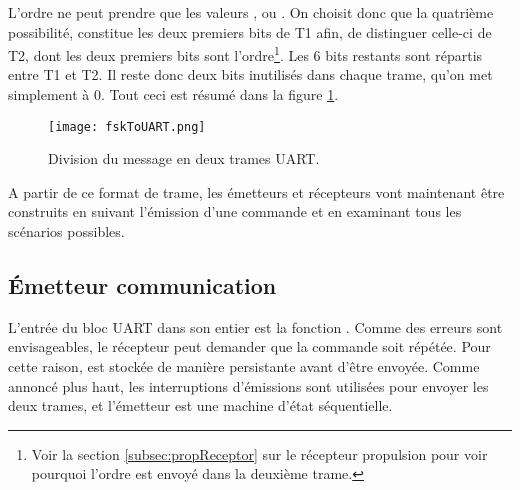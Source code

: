 L'ordre ne peut prendre que les valeurs ,  ou . On choisit donc que la quatrième possibilité,  constitue les deux premiers bits de T1 afin, de distinguer celle-ci de T2, dont les deux premiers bits sont l'ordre\footnote{Voir la section \ref{subsec:propReceptor} sur le récepteur propulsion pour voir pourquoi l'ordre est envoyé dans la deuxième trame.}. Les 6 bits restants sont répartis entre T1 et T2. Il reste donc deux bits inutilisés dans chaque trame, qu'on met simplement à 0. Tout ceci est résumé dans la figure \ref{fig:fskToUART}.
\begin{figure}[htbp]
  \centering
  \texttt{[image: fskToUART.png]}
  \caption{Division du message en deux trames UART.\label{fig:fskToUART}}
\end{figure}

A partir de ce format de trame, les émetteurs et récepteurs vont maintenant être construits en suivant l'émission d'une commande et en examinant tous les scénarios possibles.

\subsection{\'Emetteur communication}
L'entrée du bloc UART dans son entier est la fonction . Comme des erreurs sont envisageables, le récepteur peut demander que la commande soit répétée. Pour cette raison,  est stockée de manière persistante avant d'être envoyée. Comme annoncé plus haut, les interruptions d'émissions sont utilisées pour envoyer les deux trames, et l'émetteur est une machine d'état séquentielle.


